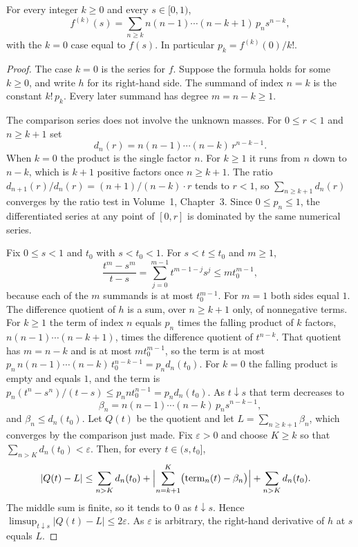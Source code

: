 \begin{proposition}\label{prop:pgfcoeff}
For every integer $k\ge0$ and every $s\in[0,1)$,
\[
 f^{(k)}(s)=\sum_{n\ge k}n(n-1)\cdots(n-k+1)\,p_n s^{n-k},
\]
with the $k=0$ case equal to $f(s)$. In particular $p_k=f^{(k)}(0)/k!$.
\end{proposition}
\begin{proof}
The case $k=0$ is the series for $f$. Suppose the formula holds for some $k\ge0$, and write $h$ for its right-hand side. The summand of index $n=k$ is the constant $k!\,p_k$. Every later summand has degree $m=n-k\ge1$.

The comparison series does not involve the unknown masses. For $0\le r<1$ and $n\ge k+1$ set
\[
 d_n(r)=n(n-1)\cdots(n-k)\,r^{n-k-1}.
\]
When $k=0$ the product is the single factor $n$. For $k\ge1$ it runs from $n$ down to $n-k$, which is $k+1$ positive factors once $n\ge k+1$. The ratio $d_{n+1}(r)/d_n(r)=(n+1)/(n-k)\cdot r$ tends to $r<1$, so $\sum_{n\ge k+1}d_n(r)$ converges by the ratio test in Volume~1, Chapter~3. Since $0\le p_n\le1$, the differentiated series at any point of $[0,r]$ is dominated by the same numerical series.

Fix $0\le s<1$ and $t_0$ with $s<t_0<1$. For $s<t\le t_0$ and $m\ge1$,
\[
 \frac{t^m-s^m}{t-s}=\sum_{j=0}^{m-1}t^{m-1-j}s^j\le m t_0^{m-1},
\]
because each of the $m$ summands is at most $t_0^{m-1}$. For $m=1$ both sides equal $1$. The difference quotient of $h$ is a sum, over $n\ge k+1$ only, of nonnegative terms. For $k\ge1$ the term of index $n$ equals $p_n$ times the falling product of $k$ factors, $n(n-1)\cdots(n-k+1)$, times the difference quotient of $t^{n-k}$. That quotient has $m=n-k$ and is at most $m t_0^{m-1}$, so the term is at most $p_n\, n(n-1)\cdots(n-k)\,t_0^{n-k-1}=p_n d_n(t_0)$. For $k=0$ the falling product is empty and equals $1$, and the term is $p_n(t^n-s^n)/(t-s)\le p_n n t_0^{n-1}=p_n d_n(t_0)$. As $t\downarrow s$ that term decreases to
\[
 \beta_n=n(n-1)\cdots(n-k)\,p_n s^{n-k-1},
\]
and $\beta_n\le d_n(t_0)$. Let $Q(t)$ be the quotient and let $L=\sum_{n\ge k+1}\beta_n$, which converges by the comparison just made. Fix $\varepsilon>0$ and choose $K\ge k$ so that $\sum_{n>K}d_n(t_0)<\varepsilon$. Then, for every $t\in(s,t_0]$,
\begin{align*}
|Q(t)-L|
&\le\sum_{n>K}d_n(t_0)
 +\Bigl|\sum_{n=k+1}^{K}\bigl(\text{term}_n(t)-\beta_n\bigr)\Bigr|
 +\sum_{n>K}d_n(t_0).
\end{align*}
The middle sum is finite, so it tends to $0$ as $t\downarrow s$. Hence $\limsup_{t\downarrow s}|Q(t)-L|\le 2\varepsilon$. As $\varepsilon$ is arbitrary, the right-hand derivative of $h$ at $s$ equals $L$.


\end{proof}
